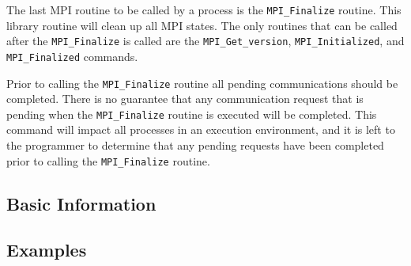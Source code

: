 The last MPI routine to be called by a process is the
\texttt{MPI\_Finalize} routine. This library routine will clean up all
MPI states. The only routines that can be called after the
\texttt{MPI\_Finalize} is called are the \texttt{MPI\_Get\_version},
\texttt{MPI\_Initialized}, and \texttt{MPI\_Finalized} commands.

Prior to calling the \texttt{MPI\_Finalize} routine all pending
communications should be completed. There is no guarantee that any
communication request that is pending when the \texttt{MPI\_Finalize}
routine is executed will be completed. This command will impact all
processes in an execution environment, and it is left to the
programmer to determine that any pending requests have been completed
prior to calling the \texttt{MPI\_Finalize} routine.


\subsection{Basic Information}


\subsection{Examples}


